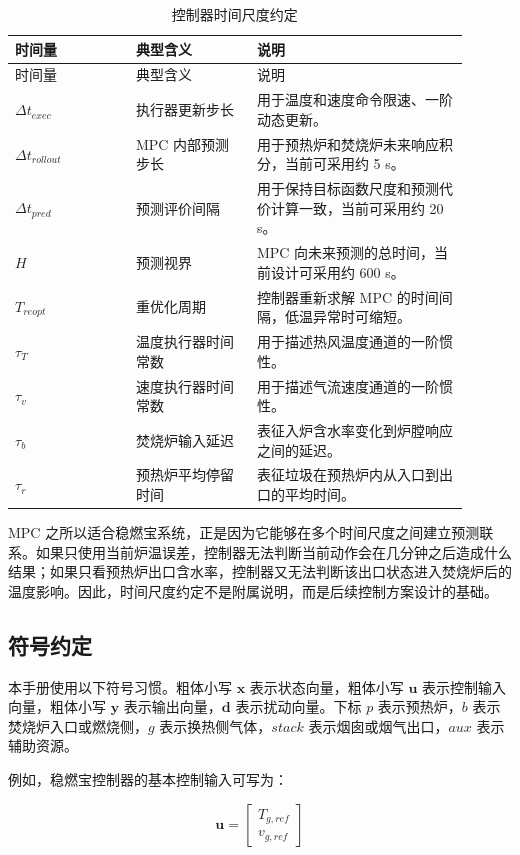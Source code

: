 \documentclass[UTF8,openany,zihao=-4,oneside]{ctexbook}
\begin{document}
\begin{longtable}{@{}p{0.24\linewidth}p{0.24\linewidth}p{0.42\linewidth}@{}}
\caption{控制器时间尺度约定}\label{tab:time-scales}\\
\toprule
时间量 & 典型含义 & 说明 \\
\midrule
\endfirsthead
\toprule
时间量 & 典型含义 & 说明 \\
\midrule
\endhead
\(\Delta t_{exec}\) & 执行器更新步长 & 用于温度和速度命令限速、一阶动态更新。 \\
\(\Delta t_{rollout}\) & MPC 内部预测步长 & 用于预热炉和焚烧炉未来响应积分，当前可采用约 5 s。 \\
\(\Delta t_{pred}\) & 预测评价间隔 & 用于保持目标函数尺度和预测代价计算一致，当前可采用约 20 s。 \\
\(H\) & 预测视界 & MPC 向未来预测的总时间，当前设计可采用约 600 s。 \\
\(T_{reopt}\) & 重优化周期 & 控制器重新求解 MPC 的时间间隔，低温异常时可缩短。 \\
\(\tau_T\) & 温度执行器时间常数 & 用于描述热风温度通道的一阶惯性。 \\
\(\tau_v\) & 速度执行器时间常数 & 用于描述气流速度通道的一阶惯性。 \\
\(\tau_b\) & 焚烧炉输入延迟 & 表征入炉含水率变化到炉膛响应之间的延迟。 \\
\(\tau_r\) & 预热炉平均停留时间 & 表征垃圾在预热炉内从入口到出口的平均时间。 \\
\bottomrule
\end{longtable}

MPC 之所以适合稳燃宝系统，正是因为它能够在多个时间尺度之间建立预测联系。如果只使用当前炉温误差，控制器无法判断当前动作会在几分钟之后造成什么结果；如果只看预热炉出口含水率，控制器又无法判断该出口状态进入焚烧炉后的温度影响。因此，时间尺度约定不是附属说明，而是后续控制方案设计的基础。

\subsection{符号约定}\label{subsec:symbols}

本手册使用以下符号习惯。粗体小写 \(\mathbf{x}\) 表示状态向量，粗体小写 \(\mathbf{u}\) 表示控制输入向量，粗体小写 \(\mathbf{y}\) 表示输出向量，\(\mathbf{d}\) 表示扰动向量。下标 \(p\) 表示预热炉，\(b\) 表示焚烧炉入口或燃烧侧，\(g\) 表示换热侧气体，\(stack\) 表示烟囱或烟气出口，\(aux\) 表示辅助资源。

例如，稳燃宝控制器的基本控制输入可写为：

\[
\mathbf{u}=
\begin{bmatrix}
T_{g,ref}\\
v_{g,ref}
\end{bmatrix}
\]
\end{document}

